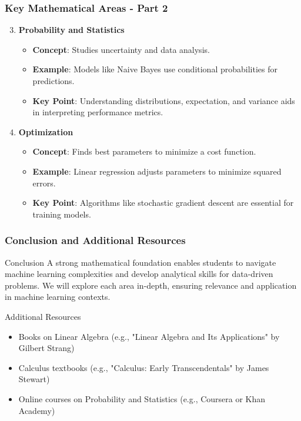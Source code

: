 \documentclass[aspectratio=169]{beamer}
\begin{document}
\begin{frame}[fragile]
    \frametitle{Key Mathematical Areas - Part 2}
    \begin{enumerate}
        \setcounter{enumi}{2} %
        \item \textbf{Probability and Statistics}
            \begin{itemize}
                \item \textbf{Concept}: Studies uncertainty and data analysis.
                \item \textbf{Example}: Models like Naive Bayes use conditional probabilities for predictions.
                \item \textbf{Key Point}: Understanding distributions, expectation, and variance aids in interpreting performance metrics.
            \end{itemize}
        \item \textbf{Optimization}
            \begin{itemize}
                \item \textbf{Concept}: Finds best parameters to minimize a cost function.
                \item \textbf{Example}: Linear regression adjusts parameters to minimize squared errors.
                \item \textbf{Key Point}: Algorithms like stochastic gradient descent are essential for training models.
            \end{itemize}
    \end{enumerate}
\end{frame}

\begin{frame}[fragile]
    \frametitle{Conclusion and Additional Resources}
    \begin{block}{Conclusion}
        A strong mathematical foundation enables students to navigate machine learning complexities and develop analytical skills for data-driven problems. We will explore each area in-depth, ensuring relevance and application in machine learning contexts.
    \end{block}
    
    \begin{block}{Additional Resources}
        \begin{itemize}
            \item Books on Linear Algebra (e.g., "Linear Algebra and Its Applications" by Gilbert Strang)
            \item Calculus textbooks (e.g., "Calculus: Early Transcendentals" by James Stewart)
            \item Online courses on Probability and Statistics (e.g., Coursera or Khan Academy)
        \end{itemize}
    \end{block}
\end{frame}
\end{document}
